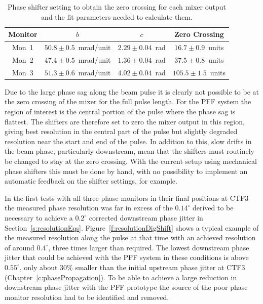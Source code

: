 \begin{table}
  \begin{center}
    \begin{tabular}{|c c c c|}
	   \hline
       Monitor & \(b\) & \(c\) & Zero Crossing \\ \hline
       Mon~1 & \(50.8\pm0.5\)~mrad/unit & \(2.29\pm0.04\)~rad & \(16.7\pm0.9\)~units \\ 
       Mon~2 & \(47.4\pm0.5\)~mrad/unit & \(1.36\pm0.04\)~rad & \(37.5\pm0.8\)~units \\
       Mon~3 & \(51.3\pm0.6\)~mrad/unit & \(4.02\pm0.04\)~rad & \(105.5\pm1.5\)~units \\ \hline
    \end{tabular}
    \caption{Phase shifter setting to obtain the zero crossing for each mixer output and the fit parameters needed to calculate them.}
  	\label{t:calZeroCross}
  \end{center}
\end{table}

Due to the large phase sag along the beam pulse it is clearly not possible to be at the zero crossing of the mixer for the full pulse length. For the PFF system the region of interest is the central portion of the pulse where the phase sag is flattest. The shifters are therefore set to zero the mixer output in this region, giving best resolution in the central part of the pulse but slightly degraded resolution near the start and end of the pulse. In addition to this, slow drifts in the beam phase, particularly downstream, mean that the shifters must routinely be changed to stay at the zero crossing. With the current setup using mechanical phase shifters this must be done by hand, with no possibility to implement an automatic feedback on the shifter settings, for example.


In the first tests with all three phase monitors in their final positions at CTF3 the measured phase resolution was far in excess of the \(0.14^\circ\) derived to be necessary to achieve a \(0.2^\circ\) corrected downstream phase jitter in Section~\ref{s:resolutionEqs}. Figure~\ref{f:resolutionDigShift} shows a typical example of the measured resolution along the pulse at that time with an achieved resolution of around \(0.4^\circ\), three times larger than required. The lowest downstream phase jitter that could be achieved with the PFF system in these conditions is above \(0.55^\circ\), only about 30\% smaller than the initial upstream phase jitter at CTF3 (Chapter~\ref{c:phasePropagation}). To be able to achieve a large reduction in downstream phase jitter with the PFF prototype the source of the poor phase monitor resolution had to be identified and removed.

